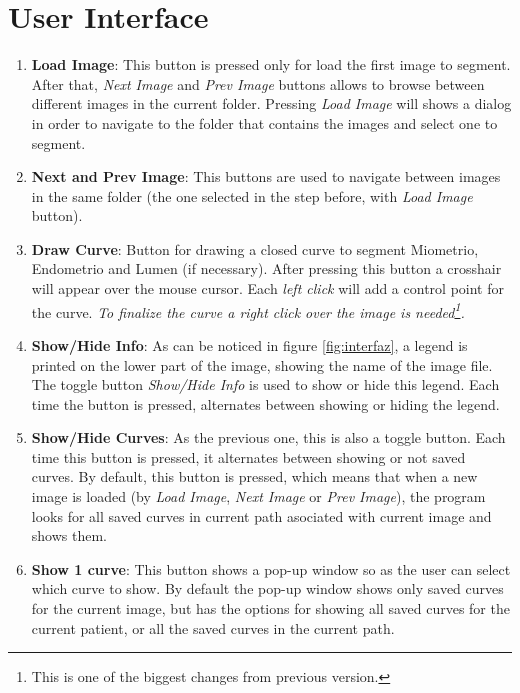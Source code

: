 \documentclass[12pt,a4paper,titlepage]{report}
\begin{document}
\section{User Interface}

\begin{enumerate}
	\item \textbf{Load Image}: This button is pressed only for load the first image to segment. After that, \emph{Next Image} and \emph{Prev Image} buttons allows to browse between different images in the current folder. Pressing \emph{Load Image} will shows a dialog in order to navigate to the folder that contains the images and select one to segment.
	\item \textbf{Next and Prev Image}: This buttons are used to navigate between images in the same folder (the one selected in the step before, with \emph{Load Image} button).
	\item \textbf{Draw Curve}: Button for drawing a closed curve to segment Miometrio, Endometrio and Lumen (if necessary). After pressing this button a crosshair will appear over the mouse cursor. Each \emph{left click} will add a control point for the curve. 
	\emph{To finalize the curve a right click over the image is needed\footnote{This is one of the biggest changes from previous version.}.}
	\item \textbf{Show/Hide Info}: As can be noticed in figure \ref{fig:interfaz}, a legend is printed on the lower part of the image, showing the name of the image file. The toggle button \emph{Show/Hide Info} is used to show or hide this legend. Each time the button is pressed, alternates between showing or hiding the legend.
	\item \textbf{Show/Hide Curves}: As the previous one, this is also a toggle button. Each time this button is pressed, it alternates between showing or not saved curves. By default, this button is pressed, which means that when a new image is loaded (by \emph{Load Image}, \emph{Next Image} or \emph{Prev Image}), the program looks for all saved curves in current path asociated with current image and shows them. 
	\item \textbf{Show 1 curve}: This button shows a pop-up window so as the user can select which curve to show. By default the pop-up window shows only saved curves for the current image, but has the options for showing all saved curves for the current patient, or all the saved curves in the current path.

\end{enumerate}
\end{document}
